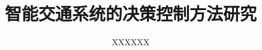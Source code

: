 \documentclass[doctor]{hnuthesis}
\title{智能交通系统的决策控制方法研究}
\author{XXXXXX}
\begin{document}
\maketitle


\tableofcontents
\begingroup
	\renewcommand*{\addvspace}[1]{}
	\newcommand{\loflabel}{图} 
	\renewcommand{\numberline}[1]{\loflabel~#1\hspace*{1em}}	
	\listoffigures
	
	\newcommand{\lotlabel}{表}
	\renewcommand{\numberline}[1]{\lotlabel~#1\hspace*{1em}}
	\listoftables
\endgroup


\mainmatter





\appendix



\backmatter

\end{document}
